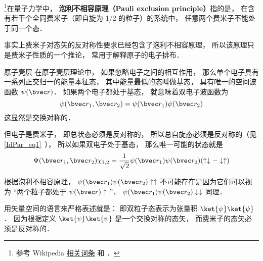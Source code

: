 
\footnote{参考 Wikipedia \href{https://en.wikipedia.org/wiki/Pauli_exclusion_principle}{相关词条} 和 \cite{GriffQ}．}在量子力学中， \textbf{泡利不相容原理（Pauli exclusion principle）}指的是， 在含有若干个全同费米子（即自旋为 1/2 的粒子）的系统中， 任意两个费米子不能处于同一个态．

事实上费米子对态矢的反对称性要求已经包含了泡利不相容原理， 所以该原理只是费米子性质的一个推论， 常用于解释原子的电子排布．

\begin{example}{原子壳层}
在原子壳层理论中， 如果忽略电子之间的相互作用， 那么单个电子具有一系列正交归一的能量本征态， 其中能量最低的态叫做基态， 具有唯一的空间波函数 $\psi(\bvec r)$． 如果两个电子都处于基态， 就意味着双电子波函数为
\begin{equation}
\psi(\bvec r_1, \bvec r_2) = \psi(\bvec r_1)\psi(\bvec r_2)
\end{equation}
这显然是交换对称的．

但电子是费米子， 即总状态必须是反对称的， 所以总自旋态必须是反对称的（见\autoref{IdPar_eq1}~）， 所以如果双电子处于基态， 那么唯一可能的状态就是
\begin{equation}
\Psi(\bvec r_1, \bvec r_2) \chi_{1,2} = \frac{1}{\sqrt{2}}\psi(\bvec r_1)\psi(\bvec r_2)(\uparrow\downarrow - \downarrow\uparrow)
\end{equation}

根据泡利不相容原理， $\psi(\bvec r_1)\psi(\bvec r_2)\uparrow\uparrow$ 不可能存在是因为它们可以视为 “两个粒子都处于 $\psi(\bvec r)\uparrow$ ”． $\psi(\bvec r_1)\psi(\bvec r_2)\downarrow\downarrow$ 同理．
\end{example}

用矢量空间的语言来严格表述就是： 即双粒子态表示为张量积 $\ket{\psi}\ket{\psi}$． 因为根据定义 $\ket{\psi}\ket{\psi}$ 是一个交换对称的态矢， 而费米子的态矢必须是反对称的．
